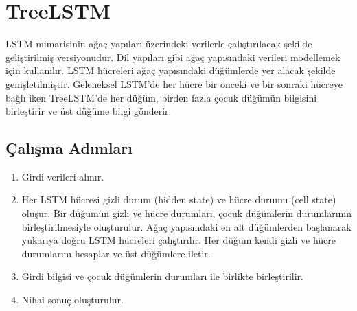 \section{TreeLSTM}
LSTM mimarisinin ağaç yapıları üzerindeki verilerle çalıştırılacak şekilde geliştirilmiş versiyonudur. Dil yapıları gibi ağaç yapısındaki verileri modellemek için kullanılır. LSTM hücreleri ağaç yapısındaki düğümlerde yer alacak şekilde genişletilmiştir. Geleneksel LSTM'de her hücre bir önceki ve bir sonraki hücreye bağlı iken TreeLSTM'de her düğüm, birden fazla çocuk düğümün bilgisini birleştirir ve üst düğüme bilgi gönderir.

\subsection{Çalışma Adımları}
\begin{enumerate}
	\item Girdi verileri alınır.
	\item Her LSTM hücresi gizli durum (hidden state) ve hücre durumu (cell state) oluşur. Bir düğümün gizli ve hücre durumları, çocuk düğümlerin durumlarının birleştirilmesiyle oluşturulur. Ağaç yapısındaki en alt düğümlerden başlanarak yukarıya doğru LSTM hücreleri çalıştırılır. Her düğüm kendi gizli ve hücre durumlarını hesaplar ve üst düğümlere iletir.
	\item Girdi bilgisi ve çocuk düğümlerin durumları ile birlikte birleştirilir.
	\item Nihai sonuç oluşturulur.
\end{enumerate}

\newpage